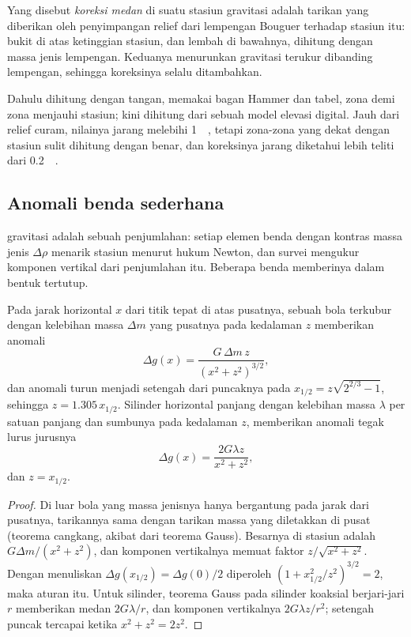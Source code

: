 \begin{definition}\label{def:b3:field-lab-methods-3:terrain}
Yang disebut \emph{koreksi medan} di suatu stasiun gravitasi
adalah tarikan yang diberikan oleh penyimpangan relief dari
lempengan Bouguer terhadap stasiun itu: bukit di atas ketinggian stasiun, dan
lembah di bawahnya, dihitung dengan massa jenis lempengan.
Keduanya menurunkan gravitasi terukur dibanding lempengan, sehingga koreksinya
selalu ditambahkan.
\end{definition}

Dahulu dihitung dengan tangan, memakai bagan Hammer dan tabel, zona demi zona
menjauhi stasiun; kini dihitung dari sebuah model elevasi
digital. Jauh dari relief curam, nilainya jarang melebihi \qty{1}{\milli\gal},
tetapi zona-zona yang dekat dengan stasiun sulit dihitung dengan benar, dan
koreksinya jarang diketahui lebih teliti dari \qty{0.2}{\milli\gal}.

\subsection{Anomali benda sederhana}

 gravitasi adalah sebuah penjumlahan: setiap elemen benda
dengan kontras massa jenis $\Delta\rho$ menarik stasiun menurut hukum Newton, dan
survei mengukur komponen vertikal dari penjumlahan itu. Beberapa benda memberinya
dalam bentuk tertutup.

\begin{theorem}\label{thm:b3:field-lab-methods-3:sphere}
Pada jarak horizontal $x$ dari titik tepat di atas pusatnya, sebuah bola
terkubur dengan kelebihan massa $\Delta m$ yang pusatnya pada kedalaman $z$ memberikan
anomali
\[
\Delta g(x) = \frac{G\,\Delta m\,z}{(x^2 + z^2)^{3/2}} ,
\]
dan anomali turun menjadi setengah dari puncaknya pada $x_{1/2} = z\sqrt{2^{2/3} - 1}$,
sehingga $z = 1.305\,x_{1/2}$. Silinder horizontal panjang dengan kelebihan massa
$\lambda$ per satuan panjang dan sumbunya pada kedalaman $z$, memberikan
anomali tegak lurus jurusnya
\[
\Delta g(x) = \frac{2G\lambda z}{x^2 + z^2} ,
\]
dan $z = x_{1/2}$.
\end{theorem}

\begin{proof}
Di luar bola yang massa jenisnya hanya bergantung pada jarak dari
pusatnya, tarikannya sama dengan tarikan massa yang diletakkan di pusat (teorema
cangkang, akibat dari teorema Gauss). Besarnya di
stasiun adalah $G\Delta m/(x^2 + z^2)$, dan komponen vertikalnya memuat
faktor $z/\sqrt{x^2 + z^2}$. Dengan menuliskan $\Delta g(x_{1/2}) =
\Delta g(0)/2$ diperoleh $(1 + x_{1/2}^2/z^2)^{3/2} = 2$, maka aturan itu. Untuk
silinder, teorema Gauss pada silinder koaksial berjari-jari $r$ memberikan
medan $2G\lambda/r$, dan komponen vertikalnya $2G\lambda z/r^2$;
setengah puncak tercapai ketika $x^2 + z^2 = 2z^2$.
\end{proof}

